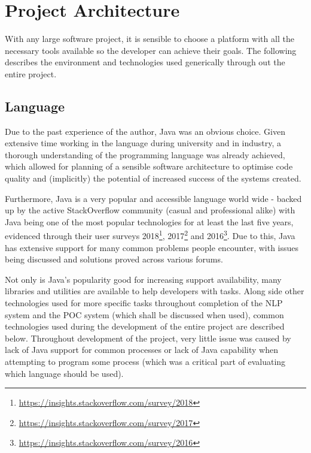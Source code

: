 \chapter{Project Architecture}
With any large software project, it is sensible to choose a platform with all the necessary tools available so the developer can achieve their goals. The following describes the environment and technologies used generically through out the entire project.

\section{Language}
Due to the past experience of the author, Java was an obvious choice. Given extensive time working in the language during university and in industry, a thorough understanding of the programming language was already achieved, which allowed for planning of a sensible software architecture to optimise code quality and (implicitly) the potential of increased success of the systems created. 

Furthermore, Java is a very popular and accessible language world wide - backed up by the active StackOverflow community (casual and professional alike) with Java being one of the most popular technologies for at least the last five years, evidenced through their user surveys 2018\footnote{\href{https://insights.stackoverflow.com/survey/2018}{https://insights.stackoverflow.com/survey/2018}}, 2017\footnote{\href{https://insights.stackoverflow.com/survey/2017}{https://insights.stackoverflow.com/survey/2017}} and 2016\footnote{\href{https://insights.stackoverflow.com/survey/2016}{https://insights.stackoverflow.com/survey/2016}}. Due to this, Java has extensive support for many common problems people encounter, with issues being discussed and solutions proved across various forums. 

Not only is Java's popularity good for increasing support availability, many libraries and utilities are available to help developers with tasks. Along side other technologies used for more specific tasks throughout completion of the NLP system and the POC system (which shall be discussed when used), common technologies used during the development of the entire project are described below. Throughout development of the project, very little issue was caused by lack of Java support for common processes or lack of Java capability when attempting to program some process (which was a critical part of evaluating which language should be used). 

